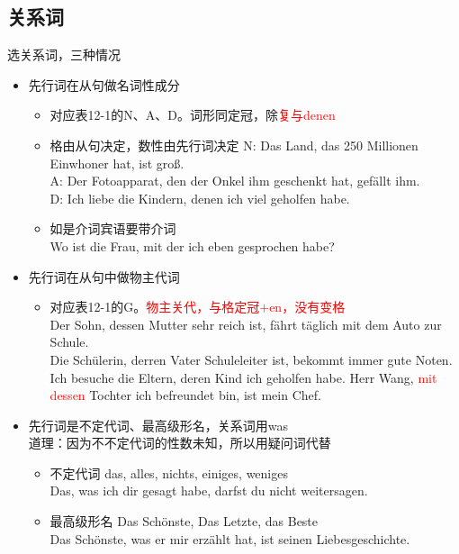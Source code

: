 \subsection{关系词}
选关系词，三种情况
\begin{itemize}
    \item 先行词在从句做名词性成分
          \begin{itemize}
              \item 对应表12-1的N、A、D。词形同定冠，除\textcolor{red}{复与denen} \\
              \item 格由从句决定，数性由先行词决定
                    N: Das Land, das 250 Millionen Einwhoner hat, ist groß. \\
                    A: Der Fotoapparat, den der Onkel ihm geschenkt hat, gefällt ihm. \\
                    D: Ich liebe die Kindern, denen ich viel geholfen habe.
              \item 如是介词宾语要带介词 \\
                    Wo ist die Frau, mit der ich eben gesprochen habe? \\
          \end{itemize}
    \item 先行词在从句中做物主代词
          \begin{itemize}
              \item 对应表12-1的G。\textcolor{red}{物主关代，与格定冠+en，没有变格} \\
                    Der Sohn, dessen Mutter sehr reich ist, fährt täglich mit dem Auto zur Schule. \\
                    Die Schülerin, derren Vater Schuleleiter ist, bekommt immer gute Noten. \\
                    Ich besuche die Eltern, deren Kind ich geholfen habe.
                    Herr Wang, \textcolor{red}{mit dessen} Tochter ich befreundet bin, ist mein Chef. \\
          \end{itemize}
    \item 先行词是不定代词、最高级形名，关系词用was \\
          道理：因为不不定代词的性数未知，所以用疑问词代替
          \begin{itemize}
              \item 不定代词 das, alles, nichts, einiges, weniges \\
                    Das, was ich dir gesagt habe, darfst du nicht weitersagen. \\
              \item 最高级形名 Das Schönste, Das Letzte, das Beste \\
                    Das Schönste, was er mir erzählt hat, ist seinen Liebesgeschichte.
          \end{itemize}
\end{itemize}


